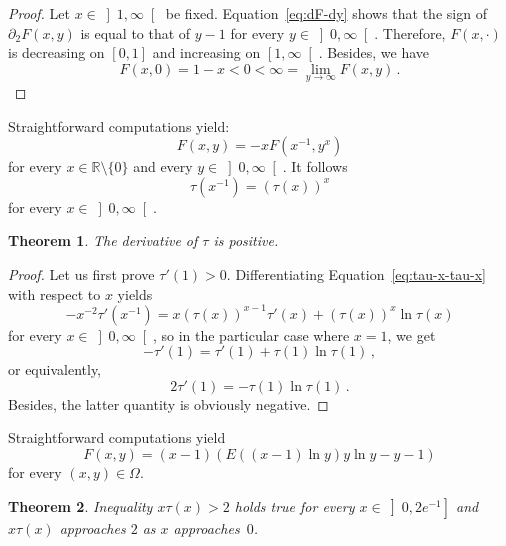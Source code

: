 \documentclass[12pt]{article}
\newcommand{\bR}{\mathbb{R}}
\newcommand{\gtint}[1]{\left] #1, \infty \right[}
\newcommand{\geint}[1]{\left[ #1, \infty \right[}
\newtheorem{theorem}{Theorem}
\begin{document}
\begin{proof}
  Let $x \in \gtint{1}$ be fixed.
   Equation~\eqref{eq:dF-dy} shows that
  the sign of $\partial_2F(x, y)$ is equal to that of $y - 1$ for every $y \in \gtint{0}$.
  Therefore, $F(x, \cdot)$ is decreasing on $\left[0, 1 \right]$ and increasing on $\geint{1}$.
  Besides, we have $$
  F(x, 0) = 1 - x < 0 < \infty = \lim_{y \to \infty} F(x, y) \, .
  $$
  
\end{proof}
Straightforward computations yield:
$$
F(x, y) = - x F(x^{-1}, y^x) 
$$
for every $x \in \bR \setminus \{ 0 \}$ and every $y \in \gtint{0}$.
It follows 
\begin{equation} \label{eq:tau-x-tau-x}
\tau(x^{- 1}) = \left( \tau(x) \right)^x 
\end{equation}
for every $x \in \gtint{0}$.

\begin{theorem}
  The derivative of $\tau$ is positive.
\end{theorem}

\begin{proof}
  Let us first prove $\tau'(1) > 0$.
  Differentiating Equation~\eqref{eq:tau-x-tau-x} with respect to $x$ yields
  $$
  -x^{-2} \tau'(x^{-1}) = x \left(\tau(x) \right)^{x - 1} \tau'(x) + \left( \tau(x) \right)^x  \ln \tau(x) 
  $$
  for every $x \in \gtint{0}$, so in the particular case where $x = 1$, we get  
  $$
  - \tau'(1) =  \tau'(1) + \tau(1) \ln \tau(1) \,, 
  $$
  or equivalently,
  $$
  2 \tau'(1) = - \tau(1) \ln  \tau(1)  \,.
  $$
  Besides, the latter quantity is obviously negative.
  
  
\end{proof} 

Straightforward computations yield 
$$
F(x, y) = (x - 1) \left( E((x - 1) \ln y) y \ln y - y - 1  \right)
$$
for every $(x, y) \in \Omega$.

\begin{theorem}
  Inequality $x \tau(x) > 2$ holds true for every $x \in \left]0, 2e^{-1} \right]$
  and $x \tau(x)$ approaches $2$ as $x$ approaches~$0$.
\end{theorem} 
\end{document}
